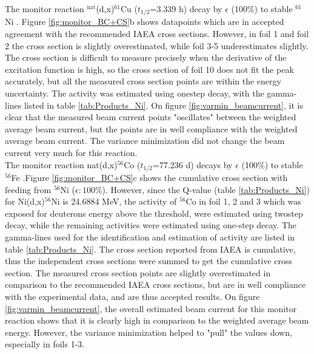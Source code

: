 \documentclass[a4paper,11pt,twoside]{book}
\begin{document}
\noindent 
The monitor reaction $^\text{nat}$(d,x)$^{61}$Cu ($t_{1/2}$=3.339 h) decay by $\epsilon$ (100\%) to stable $^{61}$Ni \cite{Zuber2015}. Figure \ref{fig:monitor_BC+CS}b shows datapoints which are in accepted agreement with the recommended IAEA cross sections. However, in foil 1 and foil 2 the cross section is slightly overestimated, while foil 3-5 underestimates slightly. The cross section is difficult to measure precisely when the derivative of the excitation function is high, so the cross section of foil 10 does not fit the peak accurately, but all the measured cross section points are within the energy uncertainty. The activity was estimated using onestep decay, with the gamma-lines listed in table \ref{tab:Products_Ni}. On figure \ref{fig:varmin_beamcurrent}, it is clear that the measured beam current points "oscillates" between the weighted average beam current, but the points are in well compliance with the weighted average beam current. The variance minimization did not change the beam current very much for this reaction. \\

\noindent 
The monitor reaction $\text{nat}$(d,x)$^{56}$Co ($t_{1/2}$=77.236 d) decays by $\epsilon$ (100\%) to stable $^{56}$Fe \cite{Junde2011}.Figure \ref{fig:monitor_BC+CS}c shows the cumulative cross section with feeding from $^{56}$Ni ($\epsilon:100\%$). However, since the Q-value (table \ref{tab:Products_Ni}) for Ni(d,x)$^{56}$Ni is 24.6884 MeV, the activity of $^{56}$Co in foil 1, 2 and 3 which was exposed for deuterons energy above the threshold, were estimated using twostep decay, while the remaining activities were estimated using one-step decay. The gamma-lines used for the identification and estimation of activity are listed in table \ref{tab:Products_Ni}. The cross section reported from IAEA is cumulative, thus the independent cross sections were summed to get the cumulative cross section. The measured cross section points are slightly overestimated in comparison to the recommended IAEA cross sections, but are in well compliance with the experimental data, and are thus accepted results. On figure \ref{fig:varmin_beamcurrent}, the overall estimated beam current for this monitor reaction shows that it is clearly high in comparison to the weighted average beam energy. However, the variance minimization helped to "pull" the values down, especially in foils 1-3. \\
\end{document}
